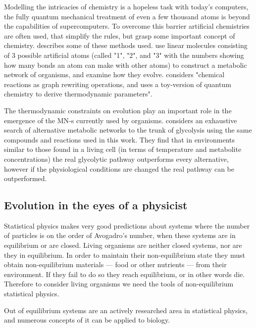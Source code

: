 \documentclass[a4paper,12pt]{article}
\begin{document}
	Modelling the intricacies of chemistry is a hopeless task with today's computers, the fully quantum mechanical treatment of even a few thousand atoms is beyond the capabilities of supercomputers. To overcome this barrier artificial chemistries are often used, that simplify the rules, but grasp some important concept of chemistry. \cite{artificialreview} describes some of these methods used. \cite{evolutioncomplex} use linear molecules consisting of 3 possible  artificial atoms (called "1", "2", and "3" with the numbers showing how many bonds an atom can make with other atoms) to construct a metabolic network of organisms, and examine how they evolve. \cite{computationalframework} considers "chemical reactions as graph rewriting operations, and uses a toy-version of quantum chemistry to derive thermodynamic parameters". %
	
	The thermodynamic constraints on evolution play an important role in the emergence of the MN-s currently used by organisms. \cite{BartekLower} considers an exhaustive search of alternative metabolic networks to the trunk of glycolysis using the same compounds and reactions used in this work. They find that in environments similar to those found in a living cell (in terms of temperature and metabolite concentrations) the real glycolytic pathway outperforms every alternative, however if the physiological conditions are changed the real pathway can be outperformed.


	
	\subsection{Evolution in the eyes of a physicist}\label{chap:whereisphysics}

	Statistical physics makes very good predictions about systems where the number of particles is on the order of Avogadro's number, when these systems are in equilibrium or are closed. Living organisms are neither closed systems, nor are they in equilibrium. In order to maintain their non-equilibrium state they must obtain non-equilibrium materials --- food or other nutrients --- from their environment. If they fail to do so they reach equilibrium, or in other words die. \cite{irreversibility} Therefore to consider living organisms we need the tools of non-equilibrium statistical physics. 

	Out of equilibrium systems are an actively researched area in statistical physics, and numerous concepts of it can be applied to biology. 
	
\end{document}
